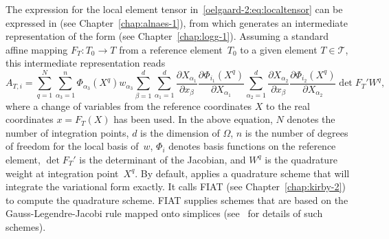The expression for the local element tensor
in~\eqref{oelgaard-2:eq:localtensor} can be expressed in \ufl{} (see
Chapter~\ref{chap:alnaes-1}), from which \ffc{} generates an intermediate
representation of the form (see Chapter~\ref{chap:logg-1}).  Assuming a
standard affine mapping $F_T : T_0 \rightarrow T$ from a reference
element~$T_{0}$ to a given element $T \in \mathcal{T}$, this intermediate
representation reads
%
\begin{equation}
  A_{T,i}
  =
  \sum_{q=1}^{N}
%
  \sum_{\alpha_{3}=1}^n
  \Phi_{\alpha_{3}}(X^q)
  w_{\alpha_{3}}
%
  \sum_{\beta=1}^d
  \sum_{\alpha_1=1}^d
  \frac{\partial X_{\alpha_1}}{\partial x_{\beta}}
  \frac{\partial \Phi_{i_1}(X^q)}{\partial X_{\alpha_1}}
  \sum_{\alpha_2=1}^d
  \frac{\partial X_{\alpha_2}}{\partial x_{\beta}}
  \frac{\partial \Phi_{i_2}(X^q)}{\partial X_{\alpha_2}}
  \det F_T'
  W^q,
\label{oelgaard-2:eq:weightedlaplacian_quadraturerepresentation}
\end{equation}
%
where a change of variables from the reference coordinates $X$ to the real
coordinates $x = F_T(X)$ has been used. In the above equation, $N$ denotes
the number of integration points, $d$ is the dimension of $\Omega$,
$n$ is the number of degrees of freedom for the local basis of~$w$,
$\Phi_{i}$ denotes basis functions on the reference element, $\det F_T'$
is the determinant of the Jacobian, and $W^q$ is the quadrature weight
at integration point~$X^q$.  By default, \ffc{} applies a quadrature
scheme that will integrate the variational form exactly.  It calls FIAT
(see Chapter~\ref{chap:kirby-2}) to compute the quadrature scheme.
FIAT supplies schemes that are based on the Gauss-Legendre-Jacobi rule
mapped onto simplices (see~\citet{KarniadakisSherwin2005} for details
of such schemes).

